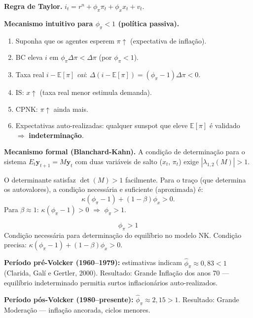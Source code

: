 \documentclass[12pt, a4paper]{article}
\newcommand{\E}{\mathbb{E}}
\begin{document}
\textbf{Regra de Taylor.}
$i_t = r^n + \phi_\pi\pi_t + \phi_x x_t + v_t$.

\textbf{Mecanismo intuitivo para $\phi_\pi < 1$ (política passiva).}
\begin{enumerate}[leftmargin=1.5em, itemsep=2pt]
  \item Suponha que os agentes esperem $\pi\uparrow$ (expectativa de inflação).
  \item BC eleva $i$ em $\phi_\pi\Delta\pi < \Delta\pi$ (por $\phi_\pi < 1$).
  \item Taxa real $i - \E[\pi]$ \emph{cai}: $\Delta(i - \E[\pi]) = (\phi_\pi - 1)\Delta\pi < 0$.
  \item IS: $x\uparrow$ (taxa real menor estimula demanda).
  \item CPNK: $\pi\uparrow$ ainda mais.
  \item Expectativas auto-realizadas: qualquer sunspot que eleve $\E[\pi]$ é
        validado $\Rightarrow$ \textbf{indeterminação}.
\end{enumerate}

\textbf{Mecanismo formal (Blanchard-Kahn).}
A condição de determinação para o sistema $E_t\mathbf{y}_{t+1} = M\mathbf{y}_t$
com duas variáveis de salto ($x_t$, $\pi_t$) exige $|\lambda_{1,2}(M)| > 1$.

O determinante satisfaz $\det(M) > 1$ facilmente. Para o traço (que determina
os autovalores), a condição necessária e suficiente (aproximada) é:
\[
\kappa(\phi_\pi - 1) + (1-\beta)\phi_x > 0.
\]
Para $\beta \approx 1$: $\kappa(\phi_\pi-1) > 0$ $\Rightarrow$ $\phi_\pi > 1$.

\begin{resultbox}[title={Princípio de Taylor (Q8)}]
\[
\boxed{\phi_\pi > 1}
\]
Condição necessária para determinação do equilíbrio no modelo NK.
Condição precisa: $\kappa(\phi_\pi-1) + (1-\beta)\phi_x > 0$.
\end{resultbox}

\begin{provabox}[title={Evidência histórica --- Para a Prova (Q8)}]
\textbf{Período pré-Volcker (1960--1979):} estimativas indicam $\hat{\phi}_\pi \approx 0{,}83 < 1$
(Clarida, Galí e Gertler, 2000). Resultado: Grande Inflação dos anos 70 ---
equilíbrio indeterminado permitia surtos inflacionários auto-realizados.

\textbf{Período pós-Volcker (1980--presente):} $\hat{\phi}_\pi \approx 2{,}15 > 1$.
Resultado: Grande Moderação --- inflação ancorada, ciclos menores.
\end{provabox}
\end{document}
